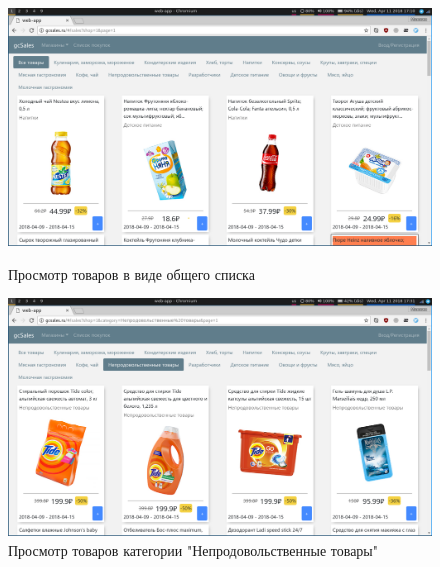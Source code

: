 \begin{figure}[h!]
    \centering
    \includegraphics[width=\textwidth]{./screenshots/interface_main.png}
    \caption{Просмотр товаров в виде общего списка}
    \endminipage\hfill
    \includegraphics[width=\textwidth]{./screenshots/categories.png}
    \caption{Просмотр товаров категории "Непродовольственные товары"}
    \endminipage
\end{figure}

